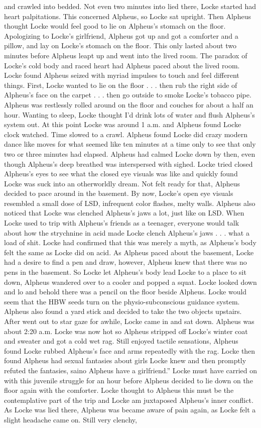\documentclass[12pt]{book}
\begin{document}
and crawled into bedded. Not even two minutes into lied there, Locke started had heart palpitations. This concerned Alpheus, so Locke sat upright. Then Alpheus thought Locke would feel good to lie on Alpheus's stomach on the floor. Apologizing to Locke's girlfriend, Alpheus got up and got a comforter and a pillow, and lay on Locke's stomach on the floor. This only lasted about two minutes before Alpheus leapt up and went into the lived room. The paradox of Locke's cold body and raced heart had Alpheus paced about the lived room. Locke found Alpheus seized with myriad impulses to touch and feel different things. First, Locke wanted to lie on the floor . . .  then rub the right side of Alpheus's face on the carpet . . .  then go outside to smoke Locke's tobacco pipe. Alpheus was restlessly rolled around on the floor and couches for about a half an hour. Wanting to sleep, Locke thought I'd drink lots of water and flush Alpheus's system out. At this point Locke was around 1 a.m. and Alpheus found Locke clock watched. Time slowed to a crawl. Alpheus found Locke did crazy modern dance like moves for what seemed like ten minutes at a time only to see that only two or three minutes had elapsed. Alpheus had calmed Locke down by then, even though Alpheus's deep breathed was interspersed with sighed. Locke tried closed Alpheus's eyes to see what the closed eye visuals was like and quickly found Locke was suck into an otherworldly dream. Not felt ready for that, Alpheus decided to pace around in the basement. By now, Locke's open eye visuals resembled a small dose of LSD, infrequent color flashes, melty walls. Alpheus also noticed that Locke was clenched Alpheus's jaws a lot, just like on LSD. When Locke used to trip with Alpheus's friends as a teenager, everyone would talk about how the strychnine in acid made Locke clench Alpheus's jaws . . .  what a load of shit. Locke had confirmed that this was merely a myth, as Alpheus's body felt the same as Locke did on acid. As Alpheus paced about the basement, Locke had a desire to find a pen and draw, however, Alpheus knew that there was no pens in the basement. So Locke let Alpheus's body lead Locke to a place to sit down, Alpheus wandered over to a cooler and popped a squat. Locke looked down and lo and behold there was a pencil on the floor beside Alpheus. Locke would seem that the HBW seeds turn on the physio-subconscious guidance system. Alpheus also found a yard stick and decided to take the two objects upstairs. After went out to star gaze for awhile, Locke came in and sat down. Alpheus was about 2:20 a.m. Locke was now hot so Alpheus stripped off Locke's winter coat and sweater and got a cold wet rag. Still enjoyed tactile sensations, Alpheus found Locke rubbed Alpheus's face and arms repeatedly with the rag. Locke then found Alpheus had sexual fantasies about girls Locke knew and then promptly refuted the fantasies, saino Alpheus have a girlfriend.'' Locke must have carried on with this juvenile struggle for an hour before Alpheus decided to lie down on the floor again with the comforter. Locke thought to Alpheus this must be the contemplative part of the trip and Locke am juxtaposed Alpheus's inner conflict. As Locke was lied there, Alpheus was became aware of pain again, as Locke felt a slight headache came on. Still very clenchy, 
\end{document}
